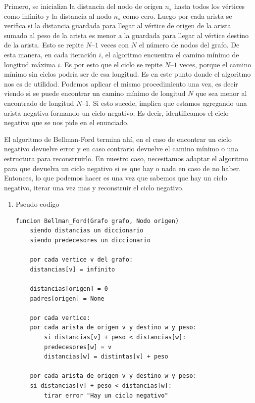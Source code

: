 \documentclass[titlepage,a4paper]{article}
\begin{document}
Primero, se inicializa la distancia del nodo de origen \(n_s\) hasta todos los
vértices como infinito y la distancia al nodo \(n_s\) como cero. Luego por cada
arista se verifica si la distancia guardada para llegar al vértice de origen de
la arista sumado al peso de la arista es menor a la guardada para llegar al
vértice destino de la arista. Esto se repite \(N – 1\) veces con \(N\) el número de
nodos del grafo. De esta manera, en cada iteración \(i\), el algoritmo encuentra el
camino mínimo de longitud máxima \(i\). Es por esto que el ciclo se repite \(N – 1\)
veces, porque el camino mínimo sin ciclos podría ser de esa longitud. Es en este
punto donde el algoritmo nos es de utilidad. Podemos aplicar el mismo
procedimiento una vez, es decir viendo si se puede encontrar un camino mínimo de
longitud \(N\) que sea menor al encontrado de longitud \(N – 1\). Si esto sucede,
implica que estamos agregando una arista negativa formando un ciclo negativo. Es
decir, identificamos el ciclo negativo que se nos pide en el enunciado.

\hfill

El algoritmo de Bellman-Ford termina ahí, en el caso de encontrar un ciclo
negativo devuelve error y en caso contrario devuelve el camino mínimo o una
estructura para reconstruirlo. En nuestro caso, necesitamos adaptar el algoritmo
para que devuelva un ciclo negativo si es que hay o nada en caso de no haber.
Entonces, lo que podemos hacer es una vez que sabemos que hay un ciclo negativo,
iterar una vez mas y reconstruir el ciclo negativo.

\pagebreak

\begin{enumerate}
\item Pseudo-codigo
\label{sec:orge57ba13}

\begin{verbatim}
funcion Bellman_Ford(Grafo grafo, Nodo origen)
    siendo distancias un diccionario
    siendo predecesores un diccionario

    por cada vertice v del grafo:
	distancias[v] = infinito

    distancias[origen] = 0
    padres[origen] = None

    por cada vertice:
	por cada arista de origen v y destino w y peso:
	    si distancias[v] + peso < distancias[w]:
		predecesores[w] = v
		distancias[w] = distintas[v] + peso

    por cada arista de origen v y destino w y peso:
	si distancias[v] + peso < distancias[w]:
	    tirar error "Hay un ciclo negativo"
\end{verbatim}
\end{enumerate}
\end{document}
